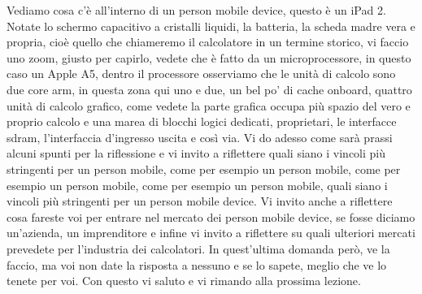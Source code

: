 Vediamo cosa c'è all'interno di un person mobile device, questo è un iPad 2.
Notate lo schermo capacitivo a cristalli liquidi, la batteria, la scheda madre vera e propria, cioè quello che chiameremo il calcolatore in un termine storico, vi faccio uno zoom, giusto per capirlo, vedete che è fatto da un microprocessore, in questo caso un Apple A5, dentro il processore osserviamo che le unità di calcolo sono due core arm, in questa zona qui uno e due, un bel po' di cache onboard, quattro unità di calcolo grafico, come vedete la parte grafica occupa più spazio del vero e proprio calcolo e una marea di blocchi logici dedicati, proprietari, le interfacce sdram, l'interfaccia d'ingresso uscita e così via.
Vi do adesso come sarà prassi alcuni spunti per la riflessione e vi invito a riflettere quali siano i vincoli più stringenti per un person mobile, come per esempio un person mobile, come per esempio un person mobile, come per esempio un person mobile, quali siano i vincoli più stringenti per un person mobile device.
Vi invito anche a riflettere cosa fareste voi per entrare nel mercato dei person mobile device, se fosse diciamo un'azienda, un imprenditore e infine vi invito a riflettere su quali ulteriori mercati prevedete per l'industria dei calcolatori.
In quest'ultima domanda però, ve la faccio, ma voi non date la risposta a nessuno e se lo sapete, meglio che ve lo tenete per voi.
Con questo vi saluto e vi rimando alla prossima lezione.